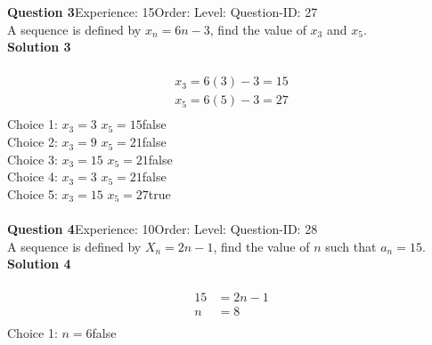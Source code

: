 \documentclass{article}
\begin{document}
\noindent\textbf{Question 3}\hspace{20pt}Experience: 15\hspace{20pt}Order: \hspace{20pt}Level: \hspace{20pt}Question-ID: 27\\[2pt]
A sequence is defined by $x_n=6n-3$, find the value of $x_3$ and $x_5$.\\[4pt]
\noindent\textbf{Solution 3}\\[2pt]
\\[-35pt]\begin{align*}
x_3=6(3)-3=15\\[2pt]
x_5=6(5)-3=27\\[2pt]
\end{align*}
Choice 1: \hspace{20pt}$x_3=3 \,\, x_5=15$\hspace{20pt}false\\
Choice 2: \hspace{20pt}$x_3=9 \,\, x_5=21$\hspace{20pt}false\\
Choice 3: \hspace{20pt}$x_3=15 \,\, x_5=21$\hspace{20pt}false\\
Choice 4: \hspace{20pt}$x_3=3 \,\, x_5=21$\hspace{20pt}false\\
Choice 5: \hspace{20pt}$x_3=15 \,\, x_5=27$\hspace{20pt}true\\
\\[4pt]
\noindent\textbf{Question 4}\hspace{20pt}Experience: 10\hspace{20pt}Order: \hspace{20pt}Level: \hspace{20pt}Question-ID: 28\\[2pt]
A sequence is defined by $X_n=2n-1$, find the value of $n$ such that $a_n=15$.\\[4pt]
\noindent\textbf{Solution 4}\\[2pt]
\\[-35pt]\begin{align*}
15&=2n-1\\[2pt]
n&=8\\[10pt]
\end{align*}
Choice 1: \hspace{20pt}$n=6$\hspace{20pt}false\\
\end{document}

